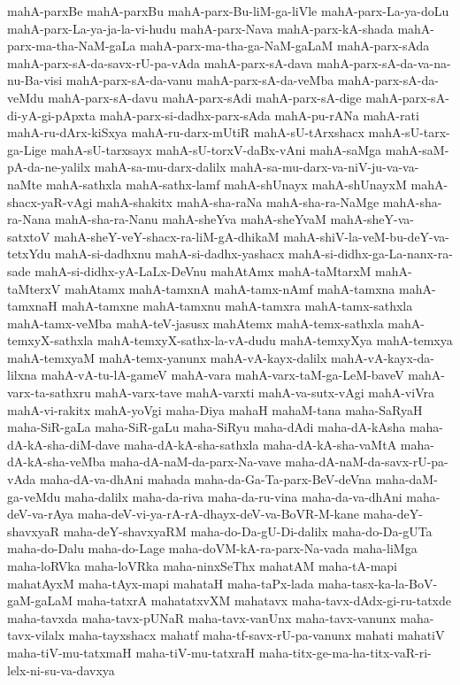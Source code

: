 {mahA-parxBe
mahA-parxBu
mahA-parx-Bu-liM-ga-liVle
mahA-parx-La-ya-doLu
mahA-parx-La-ya-ja-la-vi-hudu
mahA-parx-Nava
mahA-parx-kA-shada
mahA-parx-ma-tha-NaM-gaLa
mahA-parx-ma-tha-ga-NaM-gaLaM
mahA-parx-sAda
mahA-parx-sA-da-savx-rU-pa-vAda
mahA-parx-sA-dava
mahA-parx-sA-da-va-na-nu-Ba-visi
mahA-parx-sA-da-vanu
mahA-parx-sA-da-veMba
mahA-parx-sA-da-veMdu
mahA-parx-sA-davu
mahA-parx-sAdi
mahA-parx-sA-dige
mahA-parx-sA-di-yA-gi-pApxta
mahA-parx-si-dadhx-parx-sAda
mahA-pu-rANa
mahA-rati
mahA-ru-dArx-kiSxya
mahA-ru-darx-mUtiR
mahA-sU-tArxshacx
mahA-sU-tarx-ga-Lige
mahA-sU-tarxsayx
mahA-sU-torxV-daBx-vAni
mahA-saMga
mahA-saM-pA-da-ne-yalilx
mahA-sa-mu-darx-dalilx
mahA-sa-mu-darx-va-niV-ju-va-va-naMte
mahA-sathxla
mahA-sathx-lamf
mahA-shUnayx
mahA-shUnayxM
mahA-shacx-yaR-vAgi
mahA-shakitx
mahA-sha-raNa
mahA-sha-ra-NaMge
mahA-sha-ra-Nana
mahA-sha-ra-Nanu
mahA-sheYva
mahA-sheYvaM
mahA-sheY-va-satxtoV
mahA-sheY-veY-shacx-ra-liM-gA-dhikaM
mahA-shiV-la-veM-bu-deY-va-tetxYdu
mahA-si-dadhxnu
mahA-si-dadhx-yashacx
mahA-si-didhx-ga-La-nanx-ra-sade
mahA-si-didhx-yA-LaLx-DeVnu
mahAtAmx
mahA-taMtarxM
mahA-taMterxV
mahAtamx
mahA-tamxnA
mahA-tamx-nAmf
mahA-tamxna
mahA-tamxnaH
mahA-tamxne
mahA-tamxnu
mahA-tamxra
mahA-tamx-sathxla
mahA-tamx-veMba
mahA-teV-jasusx
mahAtemx
mahA-temx-sathxla
mahA-temxyX-sathxla
mahA-temxyX-sathx-la-vA-dudu
mahA-temxyXya
mahA-temxya
mahA-temxyaM
mahA-temx-yanunx
mahA-vA-kayx-dalilx
mahA-vA-kayx-da-lilxna
mahA-vA-tu-lA-gameV
mahA-vara
mahA-varx-taM-ga-LeM-baveV
mahA-varx-ta-sathxru
mahA-varx-tave
mahA-varxti
mahA-va-sutx-vAgi
mahA-viVra
mahA-vi-rakitx
mahA-yoVgi
maha-Diya
mahaH
mahaM-tana
maha-SaRyaH
maha-SiR-gaLa
maha-SiR-gaLu
maha-SiRyu
maha-dAdi
maha-dA-kAsha
maha-dA-kA-sha-diM-dave
maha-dA-kA-sha-sathxla
maha-dA-kA-sha-vaMtA
maha-dA-kA-sha-veMba
maha-dA-naM-da-parx-Na-vave
maha-dA-naM-da-savx-rU-pa-vAda
maha-dA-va-dhAni
mahada
maha-da-Ga-Ta-parx-BeV-deVna
maha-daM-ga-veMdu
maha-dalilx
maha-da-riva
maha-da-ru-vina
maha-da-va-dhAni
maha-deV-va-rAya
maha-deV-vi-ya-rA-rA-dhayx-deV-va-BoVR-M-kane
maha-deY-shavxyaR
maha-deY-shavxyaRM
maha-do-Da-gU-Di-dalilx
maha-do-Da-gUTa
maha-do-Dalu
maha-do-Lage
maha-doVM-kA-ra-parx-Na-vada
maha-liMga
maha-loRVka
maha-loVRka
maha-ninxSeThx
mahatAM
maha-tA-mapi
mahatAyxM
maha-tAyx-mapi
mahataH
maha-taPx-lada
maha-tasx-ka-la-BoV-gaM-gaLaM
maha-tatxrA
mahatatxvXM
mahatavx
maha-tavx-dAdx-gi-ru-tatxde
maha-tavxda
maha-tavx-pUNaR
maha-tavx-vanUnx
maha-tavx-vanunx
maha-tavx-vilalx
maha-tayxshacx
mahatf
maha-tf-savx-rU-pa-vanunx
mahati
mahatiV
maha-tiV-mu-tatxmaH
maha-tiV-mu-tatxraH
maha-titx-ge-ma-ha-titx-vaR-ri-lelx-ni-su-va-davxya
}
